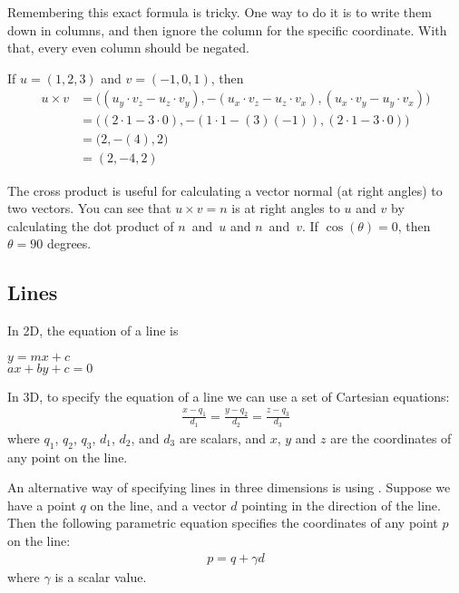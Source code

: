 \documentclass[../COS3712_Notes.tex]{subfiles}
\begin{document}
        Remembering this exact formula is tricky.
        One way to do it is to write them down in columns, and then ignore the column
        for the specific coordinate.
        With that, every even column should be negated.

        \begin{example}
          If $u = (1, 2, 3)$ and $v = (-1, 0, 1)$, then
          \begin{align*}
            u \times v &= \bigl((u_y \cdot v_z - u_z \cdot v_y), - (u_x \cdot v_z - u_z \cdot v_x),
              (u_x \cdot v_y - u_y \cdot v_x)\bigr)\\
                       &= \bigl((2 \cdot 1 - 3 \cdot 0), - (1 \cdot 1 - (3)(-1)), (2 \cdot 1 - 3 \cdot 0)\bigr)\\
                       &= \bigl(2, - (4), 2\bigr)\\
                       &= (2, -4, 2)
          \end{align*}
        \end{example}

        The cross product is useful for calculating a vector normal (at right angles)
        to two vectors.
        You can see that $u \times v = n$ is at right angles to $u$ and $v$ by calculating
        the dot product of $n$~and~$u$ and $n$~and~$v$.
        If $\cos(\theta) = 0$, then $\theta = 90$ degrees.

      \subsection{Lines}
        In 2D, the equation of a line is
        \begin{center}
          $y = mx + c$\\
          $ax + by + c = 0$
        \end{center}

        In 3D, to specify the equation of a line we can use a set of Cartesian equations:
        \begin{align*}
          \frac{x - q_1}{d_1} = \frac{y - q_2}{d_2} = \frac{z - q_3}{d_3}
        \end{align*}
        where $q_1$, $q_2$, $q_3$, $d_1$, $d_2$, and $d_3$ are scalars,
        and $x$, $y$ and $z$ are the coordinates of any point on the line.

        An alternative way of specifying lines in three dimensions is using
        .
        Suppose we have a point $q$ on the line, and a vector $d$ pointing in the direction
        of the line.
        Then the following parametric equation specifies the coordinates of any point $p$
        on the line:
        \begin{align*}
          p = q + \gamma d
        \end{align*}
        where $\gamma$ is a scalar value.
\end{document}
